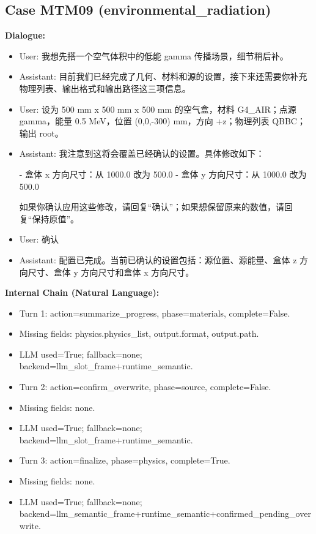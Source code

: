 \documentclass[11pt]{ctexart}
\begin{document}
\subsection{Case MTM09 (environmental\_radiation)}
\textbf{Dialogue:}
\begin{itemize}
\item User: 我想先搭一个空气体积中的低能 gamma 传播场景，细节稍后补。
\item Assistant: 目前我们已经完成了几何、材料和源的设置，接下来还需要你补充物理列表、输出格式和输出路径这三项信息。
\item User: 设为 500 mm x 500 mm x 500 mm 的空气盒，材料 G4\_AIR；点源 gamma，能量 0.5 MeV，位置 (0,0,-300) mm，方向 +z；物理列表 QBBC；输出 root。
\item Assistant: 我注意到这将会覆盖已经确认的设置。具体修改如下：

- 盒体 x 方向尺寸：从 1000.0 改为 500.0
- 盒体 y 方向尺寸：从 1000.0 改为 500.0

如果你确认应用这些修改，请回复“确认”；如果想保留原来的数值，请回复“保持原值”。
\item User: 确认
\item Assistant: 配置已完成。当前已确认的设置包括：源位置、源能量、盒体 z 方向尺寸、盒体 y 方向尺寸和盒体 x 方向尺寸。
\end{itemize}
\textbf{Internal Chain (Natural Language):}
\begin{itemize}
\item Turn 1: action=summarize\_progress, phase=materials, complete=False.
\item Missing fields: physics.physics\_list, output.format, output.path.
\item LLM used=True; fallback=none; backend=llm\_slot\_frame+runtime\_semantic.
\item Turn 2: action=confirm\_overwrite, phase=source, complete=False.
\item Missing fields: none.
\item LLM used=True; fallback=none; backend=llm\_slot\_frame+runtime\_semantic.
\item Turn 3: action=finalize, phase=physics, complete=True.
\item Missing fields: none.
\item LLM used=True; fallback=none; backend=llm\_semantic\_frame+runtime\_semantic+confirmed\_pending\_overwrite.
\end{itemize}
\end{document}
